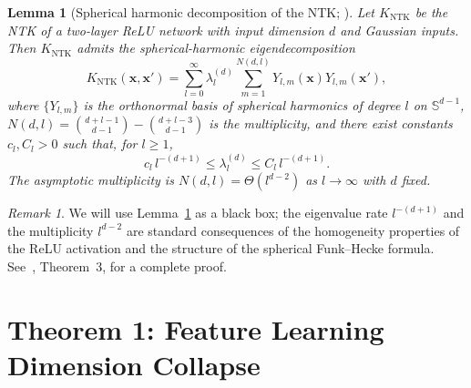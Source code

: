\documentclass[12pt]{amsart}
\newtheorem{lemma}[theorem]{Lemma}
\theoremstyle{definition}
\theoremstyle{remark}
\newtheorem{remark}[theorem]{Remark}
\newcommand{\bx}{\mathbf{x}}
\begin{document}
\begin{lemma}[Spherical harmonic decomposition of the NTK; \cite{BiettiBruna2021}]
\label{lem:ntk-spec}
Let $K_{\mathrm{NTK}}$ be the NTK of a two-layer ReLU network with input
dimension $d$ and Gaussian inputs. Then $K_{\mathrm{NTK}}$ admits the
spherical-harmonic eigendecomposition
\[
  K_{\mathrm{NTK}}(\bx, \bx')
  = \sum_{l=0}^{\infty} \lambda_{l}^{(d)}
    \sum_{m=1}^{N(d,l)} Y_{l,m}(\bx) Y_{l,m}(\bx'),
\]
where $\{Y_{l,m}\}$ is the orthonormal basis of spherical harmonics of
degree $l$ on $\mathbb{S}^{d-1}$, $N(d,l) = \binom{d+l-1}{d-1} - \binom{d+l-3}{d-1}$
is the multiplicity, and there exist constants $c_{l}, C_{l} > 0$ such
that, for $l \geq 1$,
\[
  c_{l}\, l^{-(d+1)} \leq \lambda_{l}^{(d)} \leq C_{l}\, l^{-(d+1)}.
\]
The asymptotic multiplicity is $N(d,l) = \Theta(l^{d-2})$ as $l \to \infty$
with $d$ fixed.
\end{lemma}

\begin{remark}\label{rem:cite-eq-kernel}
We will use Lemma~\ref{lem:ntk-spec} as a black box; the eigenvalue rate
$l^{-(d+1)}$ and the multiplicity $l^{d-2}$ are standard consequences of
the homogeneity properties of the ReLU activation and the structure of the
spherical Funk--Hecke formula. See~\cite{BiettiBruna2021}, Theorem~3, for
a complete proof.
\end{remark}

\section{Theorem 1: Feature Learning Dimension Collapse}\label{sec:fl-statement}
\end{document}
